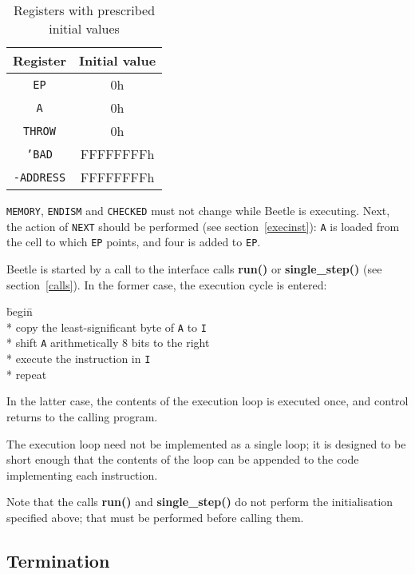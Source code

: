 \documentclass[english]{article}
\begin{document}
\begin{table}[htbp]
\begin{center}
\begin{tabular}{cc} \toprule
\bf Register & \bf Initial value \\ \midrule
{\tt EP} & 0h \\
{\tt A} & 0h \\
{\tt THROW} & 0h \\
{\tt 'BAD} & {FFFFFFFFh} \\
{\tt -ADDRESS} & {FFFFFFFFh} \\ \bottomrule
\end{tabular}
\caption{\label{inittable}Registers with prescribed initial values}
\end{center}
\end{table}

{\tt MEMORY}, {\tt ENDISM} and {\tt CHECKED} must not change while Beetle is executing. Next, the action of
{\tt NEXT} should be performed (see section~\ref{execinst}): {\tt A} is loaded
from the cell to which {\tt EP} points, and four is added to {\tt EP}.

Beetle is started by a call to the interface calls {\bf run()} or {\bf
single\_step()} (see section~\ref{calls}). In the former case, the execution
cycle is entered:

\begin{tabbing}
\hspace{0.5in}\=begin\=\+\+ \\*
copy the least-significant byte of {\tt A} to {\tt I} \\*
shift {\tt A} arithmetically 8 bits to the right \\*
execute the instruction in {\tt I} \- \\*
repeat
\end{tabbing}

In the latter case, the contents of the execution loop is executed once, and
control returns to the calling program.

The execution loop need not be implemented as a single loop; it  is designed to
be short enough that the contents of the loop can be appended  to the code
implementing each instruction.

Note that the calls {\bf run()} and {\bf single\_step()} do not perform the
initialisation specified above; that must be performed before calling them.


\subsection{Termination}
\end{document}
